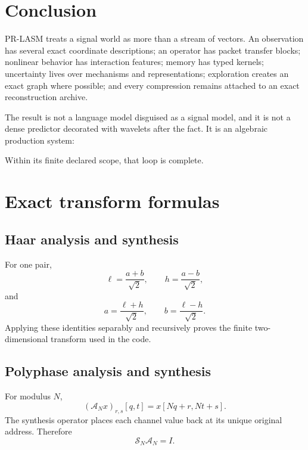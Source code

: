 \documentclass[11pt]{article}
\theoremstyle{remark}
\newcommand{\Acal}{\mathcal A}
\newcommand{\Scal}{\mathcal S}
\begin{document}
\section{Conclusion}

PR-LASM treats a signal world as more than a stream of vectors.  An observation has several exact coordinate descriptions; an operator has packet transfer blocks; nonlinear behavior has interaction features; memory has typed kernels; uncertainty lives over mechanisms and representations; exploration creates an exact graph where possible; and every compression remains attached to an exact reconstruction archive.

The result is not a language model disguised as a signal model, and it is not a dense predictor decorated with wavelets after the fact.  It is an algebraic production system:
\begin{center}
\end{center}
Within its finite declared scope, that loop is complete.

\appendix
\clearpage
\section{Exact transform formulas}

\subsection{Haar analysis and synthesis}
For one pair,
\[
\ell=\frac{a+b}{\sqrt2},\qquad h=\frac{a-b}{\sqrt2},
\]
and
\[
a=\frac{\ell+h}{\sqrt2},\qquad b=\frac{\ell-h}{\sqrt2}.
\]
Applying these identities separably and recursively proves the finite two-dimensional transform used in the code.

\subsection{Polyphase analysis and synthesis}
For modulus $N$,
\[
(\Acal_Nx)_{r,s}[q,t]=x[Nq+r,Nt+s].
\]
The synthesis operator places each channel value back at its unique original address.  Therefore
\[
\Scal_N\Acal_N=I.
\]
\end{document}
